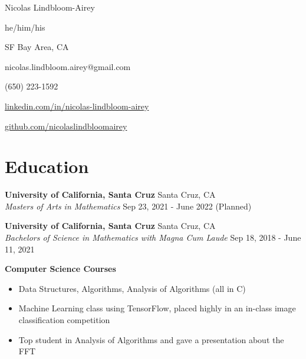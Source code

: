\documentclass[10pt,letterpaper]{article}
\begin{document}
\begin{minipage}[t]{0.6\textwidth}
{\Huge Nicolas Lindbloom-Airey}

he/him/his
\end{minipage}
\begin{minipage}[t]{0.4\textwidth}
SF Bay Area, CA 

 nicolas.lindbloom.airey@gmail.com

 (650) 223-1592 

 \href{https://www.linkedin.com/in/nicolas-lindbloom-airey/}{linkedin.com/in/nicolas-lindbloom-airey} 

 \href{https://github.com/nicolaslindbloomairey}{github.com/nicolaslindbloomairey} 

\end{minipage}


\section*{Education} \hrulefill 

\textbf{University of California, Santa Cruz} \hfill  Santa Cruz, CA\\
\textit{Masters of Arts in Mathematics} \hfill  Sep 23, 2021 - June 2022 (Planned)

\textbf{University of California, Santa Cruz} \hfill  Santa Cruz, CA\\
\textit{Bachelors of Science in Mathematics with Magna Cum Laude} \hfill  Sep 18, 2018 - June 11, 2021

\textbf{Computer Science Courses}
\begin{itemize}
    \item Data Structures, Algorithms, Analysis of Algorithms (all in C)
    \item Machine Learning class using TensorFlow, placed highly in an in-class image classification competition
    \item Top student in Analysis of Algorithms and gave a presentation about the FFT
\end{itemize}
%
%
\end{document}

